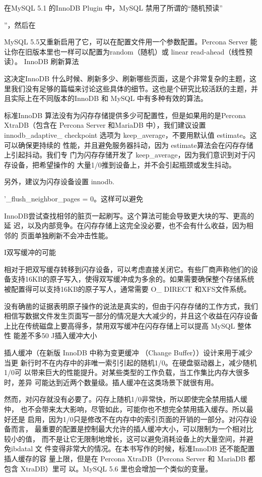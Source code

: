 在MySQL 5.1 的InnoDB Plugin 中，MySQL 禁用了所谓的“随机预读”

”，然后在

MySQL 5.5又重新启用了它，可以在配置文件用一个参数配置。Percona Server 能
让你在旧版本里也一样可以配置为random（随机）或 linear read-ahead（线性预读）。
InnoDB 刷新算法

这决定InnoDB 什么时候、刷新多少、刷新哪些页面，这是个非常复杂的主题，这
里我们没有足够的篇幅来讨论这些具体的细节。这也是个研究比较活跃的主题，并
且实际上在不同版本的InnoDB 和 MySQL 中有多种有效的算法。

标准InnoDB 算法没有为闪存存储提供多少可配置性，但是如果用的是Percona
XtraDB（包含在 Percona Server 和MariaDB 中），我们建议设置 innodb\_adaptive\_
checkpoint 选项为 keep\_average，不要用默认值 estimate。这可以确保更持续的
性能，并且避免服务器抖动，因为 estimate算法会在闪存存储上引起抖动。我们专
门为闪存存储开发了 keep\_average，因为我们意识到对于闪存设备，把希望操作的
大量1/0推到设备上，并不会引起瓶颈或发生抖动。

另外，建议为闪存设备设置 innodb.

'\_flush\_neighbor\_pages = 0。这样可以避免

InnoDB尝试查找相邻的脏页一起刷写。这个算法可能会导致更大块的写、更高的延
迟，以及内部竞争。在闪存存储上这完全没必要，也不会有什么收益，因为相邻的
页面单独刷新不会冲击性能。

I双写缓冲的可能

相对于把双写缓存转移到闪存设备，可以考虑直接关闭它。有些厂商声称他们的设
备支持16KB的原子写入，使得双写缓冲成为多余的。如果需要确保整个存储系统
被配置得可以支持16KB的原子写人，通常需要 O\_ DIRECT 和XFS文件系统。

没有确凿的证据表明原子操作的说法是真实的，但由于闪存存储的工作方式，我们
相信写数据文件发生页面写一部分的情况是大大减少的，并且这个收益在闪存设备
上比在传统磁盘上要高得多，禁用双写缓冲在闪存存储上可以提高 MySQL 整体性
能差不多50%
J插入缓冲大小

插人缓冲（在新版 InnoDB 中称为变更缓冲 （Change Buffer））设计来用于减少当更
新行时不在内存中的非唯一索引引起的随机1/0。在硬盘驱动器上，减少随机1/0可
以带来巨大的性能提升。对某些类型的工作负载，当工作集比内存大很多时，差异
可能达到近两个数量级。插人缓冲在这类场景下就很有用。

然而，对闪存就没有必要了。闪存上随机1/0非常快，所以即使完全禁用插人缓仲，
也不会带来太大影响，尽管如此，可能你也不想完全禁用插入缓存。所以最好还是
启用，因为1/0只是修改不在内存中的索引页面的开销的一部分。对闪存设备而言，
最重要的配置是控制最大允许的插人缓冲大小，可以限制为一个相对比较小的值，
而不是让它无限制地增长，这可以避免消耗设备上的大量空间，并避免ibdatal 文
件变得非常大的情况。在本书写作的时候，标准InnoDB 还不能配置插人缓存的容
量上限，但是在 Percona XtraDB（Percona Server 和 MariaDB 都包含 XtraDB）里可
以。MySQL 5.6 里也会增加一个类似的变量。

